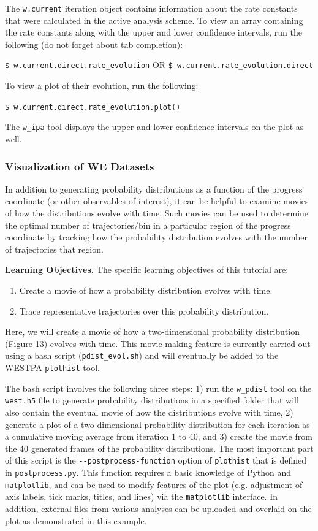 \documentclass[9pt,tutorial]{livecoms}
\begin{document}
The \verb|w.current| iteration object contains information about the rate constants that were calculated in the active analysis scheme. 
To view an array containing the rate constants along with the upper and lower confidence intervals, run the following (do not forget about tab completion): 

\verb|$ w.current.direct.rate_evolution| OR \verb|$ w.current.rate_evolution.direct|

To view a plot of their evolution, run the following:

\verb|$ w.current.direct.rate_evolution.plot()|

The \verb|w_ipa| tool displays the upper and lower confidence intervals on the plot as well. 

\subsubsection{Visualization of WE Datasets}

In addition to generating probability distributions as a function of the progress coordinate (or other observables of interest), it can be helpful to examine movies of how the distributions evolve with time. 
Such movies can be used to determine the optimal number of trajectories/bin in a particular region of the progress coordinate by tracking how the probability distribution evolves with the number of trajectories that region. 

\textbf{Learning Objectives.} The specific learning objectives of this tutorial are:
\begin{enumerate}
\item Create a movie of how a probability distribution evolves with time.
\item Trace representative trajectories over this probability distribution.
\end{enumerate}

Here, we will create a movie of how a two-dimensional probability distribution (Figure 13) evolves with time. 
This movie-making feature is currently carried out using a bash script (\verb|pdist_evol.sh|) and will eventually be added to the WESTPA \verb|plothist| tool. 

The bash script involves the following three steps: 1) run the \verb|w_pdist| tool on the \verb|west.h5| file to generate probability distributions in a specified folder that will also contain the eventual movie of how the distributions evolve with time, 2) generate a plot of a two-dimensional probability distribution for each iteration as a cumulative moving average from iteration 1 to 40, and 3) create the movie from the 40 generated frames of the probability distributions. 
The most important part of this script is the \verb|--postprocess-function| option of \verb|plothist| that is defined in \verb|postprocess.py|. 
This function requires a basic knowledge of Python and \verb|matplotlib|, and can be used to modify features of the plot (e.g. adjustment of axis labels, tick marks, titles, and lines) via the \verb|matplotlib| interface. 
In addition, external files from various analyses can be uploaded and overlaid on the plot as demonstrated in this example. 
\end{document}
